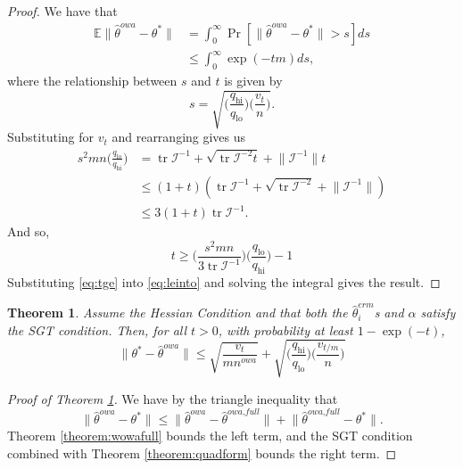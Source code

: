 \documentclass[twoside]{article}
\newtheorem{theorem}{Theorem}
\DeclareMathOperator*{\tr}{tr}
\newcommand{\qhi}{q_\text{hi}}
\newcommand{\qlo}{q_\text{lo}}
\newcommand{\nowa}{n^{\textit{owa}}}
\newcommand{\E}{\mathbb{E}}
\newcommand{\w}{\theta}
\newcommand{\wowa}{\hat\w^{owa}}
\newcommand{\wowafull}{\hat\w^{\textit{owa,full}}}
\newcommand{\wmle}{\hat\w^{erm}}
\newcommand{\wstar}{{\w^{*}}}
\newcommand{\I}{\mathcal I}
\newcommand{\ltwo}[1]{{\lVert {#1} \rVert}}
\newcommand{\prob}[1]{\Pr\left[{#1}\right]}
\begin{document}
\begin{proof}
We have that
\begin{align}
\E\ltwo{\wowa-\wstar} 
&= \int_0^\infty \prob{\ltwo{\wowa-\wstar}>s} ds
\\
&\le \int_0^\infty \exp(-tm) ds
\label{eq:leinto}
,
\end{align}
where the relationship between $s$ and $t$ is given by
\begin{equation}
s = \sqrt{\bigg(\frac{\qhi}{\qlo}\bigg)\bigg(\frac{v_t}{n}\bigg)}
.
\end{equation}
Substituting for $v_t$ and rearranging gives us
\begin{align}
s^2mn\bigg(\frac{\qlo}{\qhi}\bigg) 
&= \tr{\I^{-1}} + \sqrt{\tr{\I^{-2}t}} + \ltwo{\I^{-1}}t
\\
&\le (1+t)(\tr{\I^{-1}} + \sqrt{\tr{\I^{-2}}} + \ltwo{\I^{-1}})
\\
&\le 3(1+t)\tr{\I^{-1}}
.
\end{align}
And so,
\begin{equation}
\label{eq:tge}
t\ge
\bigg(\frac{s^2mn}{3\tr{\I^{-1}}}\bigg)\bigg(\frac{\qlo}{\qhi}\bigg) -1
\end{equation}
Substituting \eqref{eq:tge} into \eqref{eq:leinto} and solving the integral gives the result.
\end{proof}

\begin{theorem}
\label{theorem:wowa}
Assume the Hessian Condition and that both the $\wmle_i$s and $\alpha$ satisfy the SGT condition.
Then,
for all $t>0$, with probability at least $1-\exp(-t)$, 
\begin{equation}
\label{eq:wowathm}
\ltwo{\wstar-\wowa} \le 
\sqrt{\frac{v_t}{m\nowa}}
+
\sqrt{\bigg(\frac{\qhi}{\qlo}\bigg)\bigg(\frac{v_{t/m}}{n}\bigg)} 
\end{equation}
\end{theorem}

\begin{proof}[Proof of Theorem \ref{theorem:wowa}]
We have by the triangle inequality that
\begin{equation}
\ltwo{\wowa-\wstar} \le \ltwo{\wowa-\wowafull} + \ltwo{\wowafull-\wstar}
.
\end{equation}
Theorem \ref{theorem:wowafull} bounds the left term, 
and the SGT condition combined with Theorem \ref{theorem:quadform} bounds the right term.
\end{proof}
\end{document}
